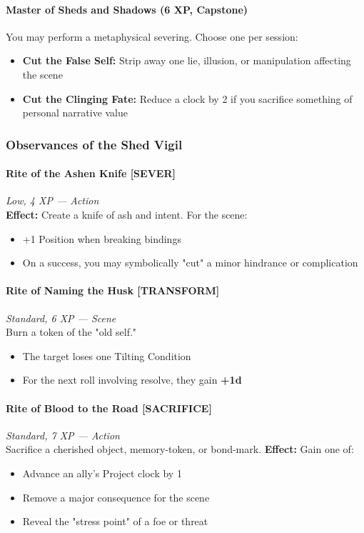 \documentclass[11pt]{book}
\begin{document}
\paragraph{Master of Sheds and Shadows (6 XP, Capstone)}
You may perform a metaphysical severing.  
Choose one per session:
\begin{itemize}[leftmargin=*]
    \item \textbf{Cut the False Self:} Strip away one lie, illusion, or manipulation affecting the scene  
    \item \textbf{Cut the Clinging Fate:} Reduce a clock by 2 if you sacrifice something of personal narrative value  
\end{itemize}

\subsubsection{Observances of the Shed Vigil}

\paragraph{Rite of the Ashen Knife [SEVER]}
\emph{Low, 4 XP --- Action} \\
\textbf{Effect:} Create a knife of ash and intent.  
For the scene:
\begin{itemize}[leftmargin=*]
    \item +1 Position when breaking bindings  
    \item On a success, you may symbolically "cut" a minor hindrance or complication  
\end{itemize}

\paragraph{Rite of Naming the Husk [TRANSFORM]}
\emph{Standard, 6 XP --- Scene} \\
Burn a token of the "old self."  
\begin{itemize}[leftmargin=*]
    \item The target loses one Tilting Condition  
    \item For the next roll involving resolve, they gain \textbf{+1d}  
\end{itemize}

\paragraph{Rite of Blood to the Road [SACRIFICE]}
\emph{Standard, 7 XP --- Action} \\
Sacrifice a cherished object, memory-token, or bond-mark.  
\textbf{Effect:} Gain one of:
\begin{itemize}[leftmargin=*]
    \item Advance an ally's Project clock by 1  
    \item Remove a major consequence for the scene  
    \item Reveal the "stress point" of a foe or threat  
\end{itemize}
\end{document}
